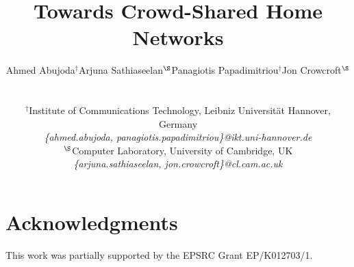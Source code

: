 \documentclass[conference]{IEEEtran}
\begin{document}
\title{Towards Crowd-Shared Home Networks}

\author{
\begin{tabular}{cccc}
\multicolumn{1}{c}{Ahmed Abujoda$^{\dagger}$} &
\multicolumn{1}{c}{Arjuna Sathiaseelan$^{\S}$} &
\multicolumn{1}{c}{Panagiotis Papadimitriou$^{\dagger}$} &
\multicolumn{1}{c}{Jon Crowcroft$^{\S}$} \\ 
\end{tabular}\\
\\
$^{\dagger}$Institute of Communications Technology, Leibniz Universit\"at Hannover, Germany\\
\textit{\footnotesize{\{ahmed.abujoda, panagiotis.papadimitriou\}@ikt.uni-hannover.de}}\\
$^{\S}$Computer Laboratory, University of Cambridge, UK\\
\textit{\footnotesize{\{arjuna.sathiaseelan, jon.crowcroft\}@cl.cam.ac.uk}} \\
}

\maketitle

\begin{abstract}

\end{abstract}






\section{Acknowledgments}
This work was partially supported by the EPSRC Grant EP/K012703/1. 
\end{document}
